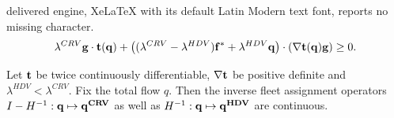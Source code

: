 \documentclass[10pt,a4paper]{amsart}
\begin{document}
delivered engine, XeLaTeX with its default Latin Modern text font, reports no missing character.
\begin{equation}
\label{eq_der1}
\lambda^{CRV} \bold{g}\cdot \bold{t(q)} + \left((\lambda^{CRV}- \lambda^{HDV}) \bold{f^*} + \lambda^{HDV}\bold{q}\right) \cdot (\nabla \bold{t}(\bold{q}) {\bold{g}})  \ge 0. 
\end{equation}

\begin{theorem}
\label{Th_continuity}
Let $\bold{t}$ be twice continuously differentiable, $\nabla \bold{t}$ be positive definite and  $\lambda^{HDV} < \lambda^{CRV}$. Fix the total flow $q$. Then the inverse fleet assignment operators $I - H^{-1} : \bold{q}\mapsto \bold{q^{CRV}}$ as well as $H^{-1}: \bold{q}\mapsto \bold{q^{HDV}}$ are continuous.  
\end{theorem}
\end{document}
